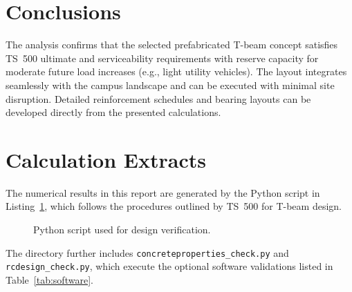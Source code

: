 \documentclass[12pt,a4paper]{report}
\begin{document}
\section{Conclusions}
The analysis confirms that the selected prefabricated T-beam concept satisfies TS~500 ultimate and serviceability requirements with reserve capacity for moderate future load increases (e.g., light utility vehicles). The layout integrates seamlessly with the campus landscape and can be executed with minimal site disruption. Detailed reinforcement schedules and bearing layouts can be developed directly from the presented calculations.

\appendix
\section{Calculation Extracts}\label{app:python}
The numerical results in this report are generated by the Python script in Listing~\ref{lst:python}, which follows the procedures outlined by TS~500 for T-beam design.

\begin{figure}[h]
\centering
\begin{minipage}{0.95\linewidth}
\scriptsize

\end{minipage}
\caption{Python script used for design verification.}
\label{lst:python}
\end{figure}

The directory further includes \texttt{concreteproperties\_check.py} and \texttt{rcdesign\_check.py}, which execute the optional software validations listed in Table~\ref{tab:software}.
\end{document}
